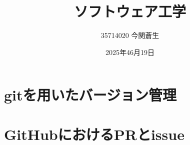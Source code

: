 \documentclass[a4paper,11pt]{ltjsarticle}
\title{ソフトウェア工学}
\author{35714020 今関蒼生}
\date{2025年46月19日}
\begin{document}
\maketitle
%
%
\section{gitを用いたバージョン管理}
\section{GitHubにおけるPRとissue}
\end{document}
